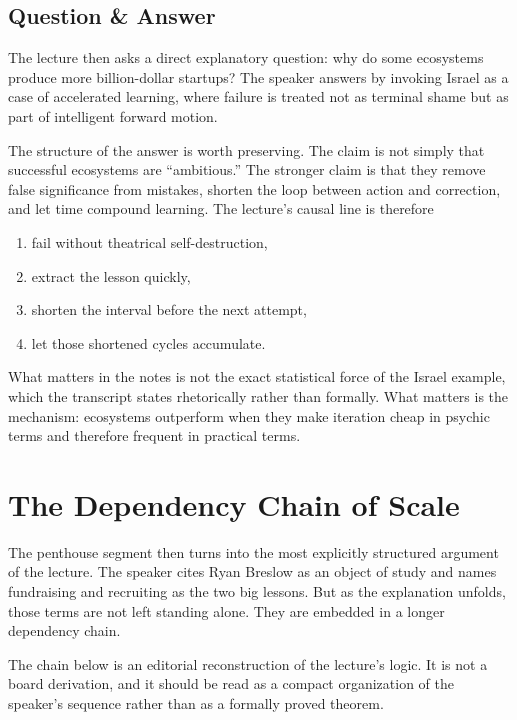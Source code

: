 \subsection{Question \& Answer}

The lecture then asks a direct explanatory question: why do some ecosystems produce more billion-dollar startups? The speaker answers by invoking Israel as a case of accelerated learning, where failure is treated not as terminal shame but as part of intelligent forward motion.

The structure of the answer is worth preserving. The claim is not simply that successful ecosystems are ``ambitious.'' The stronger claim is that they remove false significance from mistakes, shorten the loop between action and correction, and let time compound learning. The lecture's causal line is therefore
\begin{enumerate}
\item fail without theatrical self-destruction,
\item extract the lesson quickly,
\item shorten the interval before the next attempt,
\item let those shortened cycles accumulate.
\end{enumerate}

What matters in the notes is not the exact statistical force of the Israel example, which the transcript states rhetorically rather than formally. What matters is the mechanism: ecosystems outperform when they make iteration cheap in psychic terms and therefore frequent in practical terms.

\section{The Dependency Chain of Scale}

The penthouse segment then turns into the most explicitly structured argument of the lecture. The speaker cites Ryan Breslow as an object of study and names fundraising and recruiting as the two big lessons. But as the explanation unfolds, those terms are not left standing alone. They are embedded in a longer dependency chain.

\begin{remark}
The chain below is an editorial reconstruction of the lecture's logic. It is not a board derivation, and it should be read as a compact organization of the speaker's sequence rather than as a formally proved theorem.
\end{remark}

